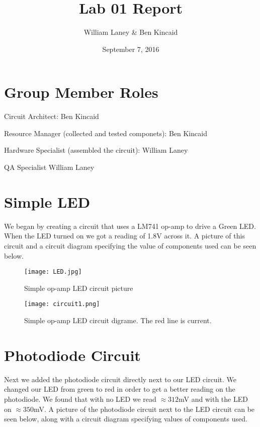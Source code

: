 \documentclass[prl,12pt,notitlepage,aps,onecolumn,superscriptaddress]{revtex4-1}
\begin{document}
\title{Lab 01 Report}
\author{William Laney \& Ben Kincaid}
\date{September 7, 2016}
\maketitle

\section{Group Member Roles}

Circuit Architect: Ben Kincaid

Resource Manager (collected and tested componets): Ben Kincaid

Hardware Specialist (assembled the circuit): William Laney

QA Specialist William Laney


\section{Simple LED}
We began by creating a circuit that uses a LM741 op-amp to drive a Green LED. When the LED turned on we got a reading of 1.8V across it. A picture of this circuit and a circuit diagram specifying the value of components used can be seen below.

\begin{figure}[H]
\begin{center}
\texttt{[image: LED.jpg]}
\end{center}
\caption{\label{fig:pic} Simple op-amp LED circuit picture}
\end{figure}

\begin{figure}[H]
\begin{center}
\texttt{[image: circuit1.png]}
\end{center}
\caption{\label{fig:pic} Simple op-amp LED circuit digrame. The red line is current.}
\end{figure}

\section{Photodiode Circuit}
Next we added the photodiode circuit directly next to our LED circuit. We changed our LED from green to red in order to get a better reading on the photodiode. We found that with no LED we read $\approx 312$mV and with the LED on $\approx 350$mV. A picture of the photodiode circuit next to the LED circuit can be seen below, along with a circuit diagram specifying values of components used.
\end{document}
